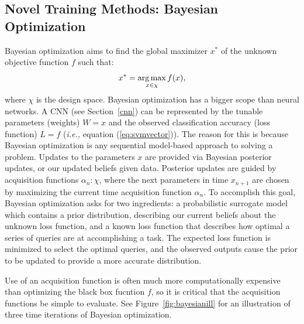 \subsection{Novel Training Methods: Bayesian Optimization}
\label{bayesian}
Bayesian optimization\cite{bayesian} aims to find the global maximizer $x^*$ of the unknown objective function $f$ such that:
\begin{equation}
\label{eq:bayesianfun}
x^* = \operatorname*{arg\,max}_{x\in \chi} f(x),
\end{equation}
where $\chi$ is the design space. Bayesian optimization has a bigger scope than neural networks. A CNN (see Section~\ref{cnn}) can be represented by the tunable parameters (weights) $W=x$ and the observed classification accuracy (loss function) $L=f$ (\textit{i.e.,} equation (\ref{eq:svmvector})). The reason for this is because Bayesian optimization is any sequential model-based approach to solving a problem. Updates to the parameters $x$ are provided via Bayesian posterior updates, or our updated beliefs given data. Posterior updates are guided by acquisition functions $\alpha_n : \chi$, where the next parameters in time $x_{n+1}$ are chosen by maximizing the current time acquisition function $\alpha_n$. To accomplish this goal, Bayesian optimization asks for two ingredients: a probabilistic surrogate model which contains a prior distribution, describing our current beliefs about the unknown loss function, and a known loss function that describes how optimal a series of queries are at accomplishing a task. The expected loss function is minimized to select the optimal queries, and the observed outputs cause the prior to be updated to provide a more accurate distribution.

Use of an acquisition function is often much more computationally expensive than optimizing the black box fucntion $f$, so it is critical that the acquisition functions be simple to evaluate. See Figure~\ref{fig:bayesianill} for an illustration of three time iterations of Bayesian optimization.

